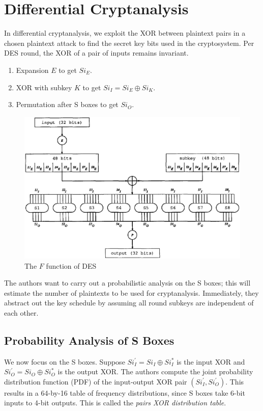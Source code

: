 \documentclass[twoside]{article}
\begin{document}



\section{Differential Cryptanalysis}
In differential cryptanalysis, we exploit the XOR between plaintext pairs in a chosen plaintext attack to find the secret key bits used in the cryptosystem. Per DES round, the XOR of a pair of inputs remains invariant.

\begin{enumerate}
    \item Expansion \(E\) to get \(Si_E\).
    \item XOR with subkey \(K\) to get \(Si_I = Si_E \oplus Si_K\).
    \item Permutation after S boxes to get \(Si_O\).
\end{enumerate}

\begin{figure}[!ht]
    \centering
    \includegraphics[width=0.5\linewidth]{images/des_f.png}
    \caption{The \(F\) function of DES}
    \label{fig:des-f}
\end{figure}

The authors want to carry out a probabilistic analysis on the S boxes; this will estimate the number of plaintexts to be used for cryptanalysis. Immediately, they abstract out the key schedule by assuming all round subkeys are independent of each other.

\subsection{Probability Analysis of S Boxes}
We now focus on the S boxes. Suppose \(Si_I^\prime = Si_I \oplus Si_I^*\) is the input XOR and \(Si_O^\prime = Si_O \oplus Si_O^*\) is the output XOR. The authors compute the joint probability distribution function (PDF) of the input-output XOR pair \((Si_I^\prime, Si_O^\prime)\). This results in a 64-by-16 table of frequency distributions, since S boxes take 6-bit inputs to 4-bit outputs. This is called the \emph{pairs XOR distribution table}.
\end{document}
